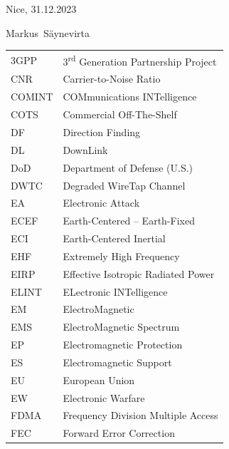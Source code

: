 \documentclass[english, 12pt, a4paper, elec, utf8, a-1b, online]{aaltothesis}
\begin{document}
\vspace{5cm}
Nice, 31.12.2023

\vspace{5mm}
{\hfill Markus\ Säynevirta \hspace{1cm}}

\newpage

\thesistableofcontents


\begin{tabular}{ll}
3GPP                    & 3\textsuperscript{rd} Generation Partnership Project \\
CNR                     & Carrier-to-Noise Ratio \\
COMINT                  & COMmunications INTelligence \\
COTS                    & Commercial Off-The-Shelf \\
DF                      & Direction Finding \\
DL                      & DownLink \\
DoD                     & Department of Defense (U.S.) \\
DWTC                    & Degraded WireTap Channel \\
EA                      & Electronic Attack \\
ECEF                    & Earth-Centered -- Earth-Fixed \\
ECI                     & Earth-Centered Inertial \\
EHF                     & Extremely High Frequency \\
EIRP                    & Effective Isotropic Radiated Power \\
ELINT                   & ELectronic INTelligence \\
EM                      & ElectroMagnetic \\
EMS                     & ElectroMagnetic Spectrum \\
EP                      & Electromagnetic Protection \\
ES                      & Electromagnetic Support \\
EU                      & European Union \\
EW                      & Electronic Warfare \\
FDMA                    & Frequency Division Multiple Access \\
FEC                     & Forward Error Correction \\

\end{tabular}
\end{document}
